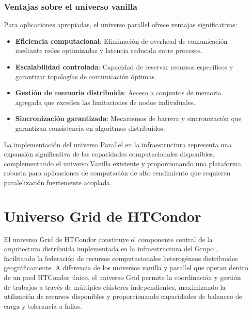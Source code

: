 \subsubsection{Ventajas sobre el universo vanilla}
\noindent

Para aplicaciones apropiadas, el universo parallel ofrece ventajas significativas:

\begin{itemize}
	\item \textbf{Eficiencia computacional}: Eliminación de overhead de comunicación mediante redes optimizadas y latencia reducida entre procesos.

	\item \textbf{Escalabilidad controlada}: Capacidad de reservar recursos específicos y garantizar topologías de comunicación óptimas.

	\item \textbf{Gestión de memoria distribuida}: Acceso a conjuntos de memoria agregada que exceden las limitaciones de nodos individuales.

	\item \textbf{Sincronización garantizada}: Mecanismos de barrera y sincronización que garantizan consistencia en algoritmos distribuidos.
\end{itemize}

La implementación del universo Parallel en la infraestructura \GRID representa una expansión significativa de las capacidades computacionales disponibles, complementando el universo Vanilla existente y proporcionando una plataforma robusta para aplicaciones de computación de alto rendimiento que requieren paralelización fuertemente acoplada.

\section{Universo Grid de HTCondor}
\noindent

El universo Grid de HTCondor constituye el componente central de la arquitectura distribuida implementada en la infraestructura del Grupo \GRID, facilitando la federación de recursos computacionales heterogéneos distribuidos geográficamente. A diferencia de los universos vanilla y parallel que operan dentro de un pool HTCondor único, el universo Grid permite la coordinación y gestión de trabajos a través de múltiples clústeres independientes, maximizando la utilización de recursos disponibles y proporcionando capacidades de balanceo de carga y tolerancia a fallos.

